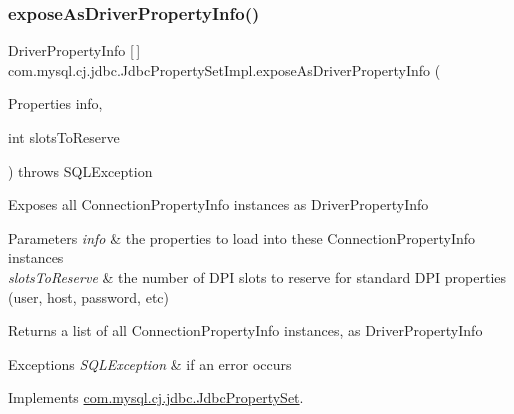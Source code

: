 \subsubsection{\texorpdfstring{expose\+As\+Driver\+Property\+Info()}{exposeAsDriverPropertyInfo()}}
{\footnotesize\ttfamily Driver\+Property\+Info \mbox{[}$\,$\mbox{]} com.\+mysql.\+cj.\+jdbc.\+Jdbc\+Property\+Set\+Impl.\+expose\+As\+Driver\+Property\+Info (\begin{DoxyParamCaption}\item[{Properties}]{info,  }\item[{int}]{slots\+To\+Reserve }\end{DoxyParamCaption}) throws S\+Q\+L\+Exception}

Exposes all Connection\+Property\+Info instances as Driver\+Property\+Info


\begin{DoxyParams}{Parameters}
{\em info} & the properties to load into these Connection\+Property\+Info instances \\
\hline
{\em slots\+To\+Reserve} & the number of D\+PI slots to reserve for \textquotesingle{}standard\textquotesingle{} D\+PI properties (user, host, password, etc)\\
\hline
\end{DoxyParams}
\begin{DoxyReturn}{Returns}
a list of all Connection\+Property\+Info instances, as Driver\+Property\+Info
\end{DoxyReturn}

\begin{DoxyExceptions}{Exceptions}
{\em S\+Q\+L\+Exception} & if an error occurs \\
\hline
\end{DoxyExceptions}


Implements \mbox{\hyperlink{interfacecom_1_1mysql_1_1cj_1_1jdbc_1_1_jdbc_property_set_a3d74db3873b64c6ed704a443e9993359}{com.\+mysql.\+cj.\+jdbc.\+Jdbc\+Property\+Set}}.

\mbox{\label{classcom_1_1mysql_1_1cj_1_1jdbc_1_1_jdbc_property_set_impl_a2a59c7314cac752f363503d96a4b45fc}} 

